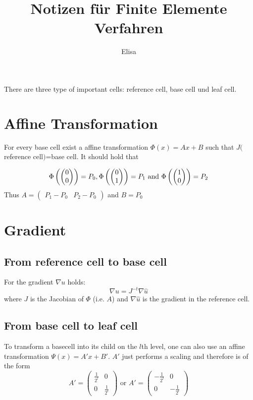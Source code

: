 \documentclass[a4paper,11pt]{article}
\title{Notizen für Finite Elemente Verfahren}
\author{Elisa}
\begin{document}
\maketitle

There are three type of important cells: reference cell, base cell und leaf cell.

\section*{Affine Transformation}
For every base cell exist a affine transformation $\Phi(x) = Ax+B$ such that $J($reference cell$)$=base cell. It should hold that 

\[
\Phi\left(\begin{pmatrix} 0 \\ 0 \end{pmatrix}\right) = P_0, \Phi\left(\begin{pmatrix} 0 \\ 1 \end{pmatrix}\right) = P_1 \textnormal{ and } \Phi\left(\begin{pmatrix} 1 \\ 0 \end{pmatrix}\right) = P_2
\]
Thus $ A = \begin{pmatrix} P_1-P_0 & P_2-P_0\end{pmatrix}$ and $B = P_0$

\section*{Gradient}

\subsection*{From reference cell to base cell}
For the gradient $\nabla u$ holds:
\[\nabla u  = J^{-t} \nabla \hat u \]
where $J$ is the Jacobian of $\Phi$ (i.e. $A$) and $\nabla \hat u$ is the gradient in the reference cell.

\subsection*{From base cell to leaf cell}
To transform a basecell into its child on the $l$th level, one can also use an affine transformation $\Psi(x) = A'x+ B'$. $A'$ just performs a scaling and therefore is of the form 
\[
A' = \begin{pmatrix}  \frac 1  {2^l} & 0 \\ 0 & \frac 1 {2^l}\end{pmatrix} \text{ or } A' = \begin{pmatrix}  -\frac 1  {2^l} & 0 \\ 0 & -\frac 1 {2^l}\end{pmatrix}
\]
\end{document}
